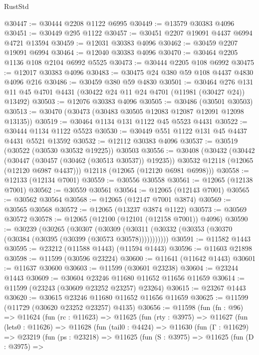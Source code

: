 \begin{lexlean}{RustStd}
\begin{coremodule}
@30447 := @30444 @2208 @1122 @6995
@30449 := @13579 @30383 @4096
@30451 := @30449 @295 @1122
@30457 := @30451 @2207 @19091 @4437 @6994 @4721 @13594
@30459 := @12031 @30383 @4096
@30462 := @30459 @2207 @19091 @6994
@30464 := @12040 @30383 @4096
@30470 := @30464 @2205 @1136 @108 @2104 @6992 @5525
@30473 := @30444 @2205 @108 @6992
@30475 := @12017 @30383 @4096
@30483 := @30475 @24 @380 @59 @108 @4437 @4830 @4096 @216
@30486 := @30459 @380 @59 @4830
@30501 := @30464
    @276
    @131
    @11
    @45
    @4701
    @4431
    (@30422 @24 @11 @24 @4701 (@11981 (@30427 @24)) @13492)
@30503 := @12076 @30383 @4096
@30505 := @30486 (@30501 @30503)
@30513 := @30470 (@30473 (@30483 @30505 @12083 @12087 @12091 @12098 @13135))
@30519 := @30464 @1134 @131 @1122 @45 @5523 @4431
@30522 := @30444 @1134 @1122 @5523
@30530 := @30449 @551 @1122 @131 @45 @4437 @4431 @5521 @13592
@30532 := @12112 @30383 @4096
@30537 := @30519 (@30522 (@30530 @30532 @19225)) @30503
@30556 := @30408
    (@30432
      (@30442
        (@30447 (@30457 (@30462 (@30513 @30537)) @19235))
        @30532
        @12118
        (@12065 (@12120 @6987 @4437)))
      @12118
      (@12065 (@12120 @6981 @6998)))
@30558 := @12133 (@12134 @7001)
@30559 := @30556 @30558
@30561 := @12065 (@12138 @7001)
@30562 := @30559 @30561
@30564 := @12065 (@12143 @7001)
@30565 := @30562 @30564
@30568 := @12065 (@12147 @7001 @3874)
@30569 := @30565 @30568
@30572 := @12065 (@13237 @3874 @1122)
@30573 := @30569 @30572
@30578 := @12065 (@12100 (@12101 (@12158 @7001)) @4096)
@30590 := @30239
    (@30265
      (@30307
        (@30309 (@30311 (@30332 (@30353 (@30370 (@30384 (@30395 (@30399 (@30573 @30578)))))))))))
@30591 := @11582 @1443
@30595 := @23212 (@11588 @1443) (@11594 @1443)
@30596 := @11603 @21898
@30598 := @11599 (@30596 @23224)
@30600 := @11641 (@11642 @1443)
@30601 := @11637 @30600
@30603 := @11599 (@30601 @23238)
@30604 := @23244 @1443
@30609 := @30604 @23246 @11680 @11652 @11656 @11659
@30614 := @11599 (@23243 (@30609 @23252 @23257) @23264)
@30615 := @23267 @1443
@30620 := @30615 @23246 @11680 @11652 @11656 @11659
@30625 := @11599 (@11729 (@30620 @23252 @23257) @4135)
@30656 := @11598
    (fun (fn : @96) =>
    @11624
      (fun (rc : @11623) =>
      @11625
        (fun (rty : @3975) =>
        @11627
          (fun (lets0 : @11626) =>
          @11628
            (fun (tail0 : @4424) =>
            @11630
              (fun (Γ : @11629) =>
              @23219
                (fun (ps : @23218) =>
                @11625
                  (fun (S : @3975) =>
                  @11625
                    (fun (D : @3975) =>

\end{coremodule}
\end{lexlean}
